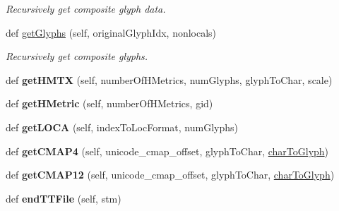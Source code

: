 \begin{DoxyCompactItemize}
\begin{DoxyCompactList}\small\item\em Recursively get composite glyph data. \end{DoxyCompactList}\item 
def \hyperlink{class_libraries_1_1fpdf_1_1ttfonts_1_1_t_t_font_file_a008623a65c9dca3af0eb342e4760c91a}{get\+Glyphs} (self, original\+Glyph\+Idx, nonlocals)\hypertarget{class_libraries_1_1fpdf_1_1ttfonts_1_1_t_t_font_file_a008623a65c9dca3af0eb342e4760c91a}{}\label{class_libraries_1_1fpdf_1_1ttfonts_1_1_t_t_font_file_a008623a65c9dca3af0eb342e4760c91a}

\begin{DoxyCompactList}\small\item\em Recursively get composite glyphs. \end{DoxyCompactList}\item 
def {\bfseries get\+H\+M\+TX} (self, number\+Of\+H\+Metrics, num\+Glyphs, glyph\+To\+Char, scale)\hypertarget{class_libraries_1_1fpdf_1_1ttfonts_1_1_t_t_font_file_a7b98166ce31a651f99f1efb7ea109156}{}\label{class_libraries_1_1fpdf_1_1ttfonts_1_1_t_t_font_file_a7b98166ce31a651f99f1efb7ea109156}

\item 
def {\bfseries get\+H\+Metric} (self, number\+Of\+H\+Metrics, gid)\hypertarget{class_libraries_1_1fpdf_1_1ttfonts_1_1_t_t_font_file_a385f9d8544d5cff395688a4ee2218673}{}\label{class_libraries_1_1fpdf_1_1ttfonts_1_1_t_t_font_file_a385f9d8544d5cff395688a4ee2218673}

\item 
def {\bfseries get\+L\+O\+CA} (self, index\+To\+Loc\+Format, num\+Glyphs)\hypertarget{class_libraries_1_1fpdf_1_1ttfonts_1_1_t_t_font_file_a463e5cef1e13dfdf20132408a6712f59}{}\label{class_libraries_1_1fpdf_1_1ttfonts_1_1_t_t_font_file_a463e5cef1e13dfdf20132408a6712f59}

\item 
def {\bfseries get\+C\+M\+A\+P4} (self, unicode\+\_\+cmap\+\_\+offset, glyph\+To\+Char, \hyperlink{class_libraries_1_1fpdf_1_1ttfonts_1_1_t_t_font_file_af69ad0ac8c81467ff75c251c0637e632}{char\+To\+Glyph})\hypertarget{class_libraries_1_1fpdf_1_1ttfonts_1_1_t_t_font_file_ac543e0ce72f872cdbe86ae148c43f17d}{}\label{class_libraries_1_1fpdf_1_1ttfonts_1_1_t_t_font_file_ac543e0ce72f872cdbe86ae148c43f17d}

\item 
def {\bfseries get\+C\+M\+A\+P12} (self, unicode\+\_\+cmap\+\_\+offset, glyph\+To\+Char, \hyperlink{class_libraries_1_1fpdf_1_1ttfonts_1_1_t_t_font_file_af69ad0ac8c81467ff75c251c0637e632}{char\+To\+Glyph})\hypertarget{class_libraries_1_1fpdf_1_1ttfonts_1_1_t_t_font_file_a22c2c2aa114b8b7c77216c6dda652de5}{}\label{class_libraries_1_1fpdf_1_1ttfonts_1_1_t_t_font_file_a22c2c2aa114b8b7c77216c6dda652de5}

\item 
def {\bfseries end\+T\+T\+File} (self, stm)\hypertarget{class_libraries_1_1fpdf_1_1ttfonts_1_1_t_t_font_file_ae13c08d4b247cb6e3d7736b3fe16528d}{}\label{class_libraries_1_1fpdf_1_1ttfonts_1_1_t_t_font_file_ae13c08d4b247cb6e3d7736b3fe16528d}

\end{DoxyCompactItemize}

